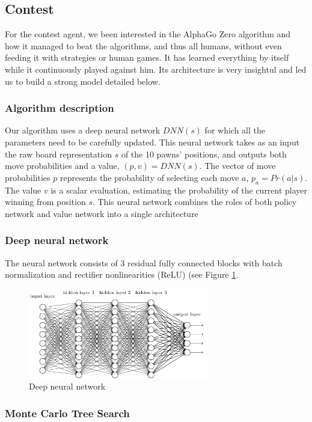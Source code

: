 \documentclass[journal,onecolumn]{IEEEtran}
\begin{document}
\subsection{Contest}
For the contest agent, we been interested in the AlphaGo Zero algorithm and how it managed to beat the algorithms, and thus all humans, without even feeding it with strategies or human games. It has learned everything by itself while it continuously played against him. Its architecture is very insightul and led us to build a strong model detailed below.

\subsubsection*{Algorithm description}
Our algorithm uses a deep neural network $DNN(s)$ for which all the parameters need to be carefully updated. This neural network takes as an input the raw board representation $s$ of the 10 pawns' positions, and outputs both move probabilities and a value, $(p, v) = DNN(s)$.
The vector of move probabilities $p$ represents the probability of selecting each move $a$, $p_a = Pr(a|s)$. The value $v$ is a scalar evaluation, estimating the probability of the current player winning from position $s$. This neural network combines the roles of both policy network and value network into a single architecture %

\subsubsection*{Deep neural network}
The neural network consists of 3 residual fully connected blocks with batch normalization and rectifier nonlinearities (ReLU) (see Figure \ref{fig:DNN}. 

\begin{figure}[H]
    \centering
    \includegraphics[width=0.7\textwidth]{img/dnn.png}
    \caption{Deep neural network}
    \label{fig:DNN}
\end{figure}

\subsubsection*{Monte Carlo Tree Search}
\end{document}
